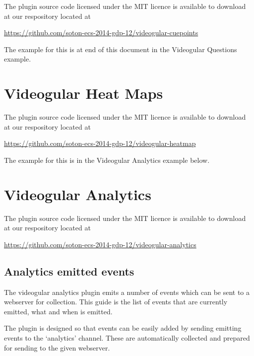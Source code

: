 \documentclass[12pt,a4paper]{article}
\begin{document}
The plugin source code licensed under the MIT licence is available to download at our respository located at 

\url{https://github.com/soton-ecs-2014-gdp-12/videogular-cuepoints}

The example for this is at end of this document in the Videogular Questions example.

\section*{Videogular Heat Maps}

The plugin source code licensed under the MIT licence is available to download at our respository located at 

\url{https://github.com/soton-ecs-2014-gdp-12/videogular-heatmap}

The example for this is in the Videogular Analytics example below.

\section*{Videogular Analytics}

The plugin source code licensed under the MIT licence is available to download at our respository located at 

\url{https://github.com/soton-ecs-2014-gdp-12/videogular-analytics}

\subsection*{Analytics emitted events}

The videogular analytics plugin emits a number of events which can be sent to a webserver for collection. This guide is the list of events that are currently emitted, what and when is emitted.

The plugin is designed so that events can be easily added by sending emitting events to the `analytics' channel. These are automatically collected and prepared for sending to the given webserver.
\end{document}
